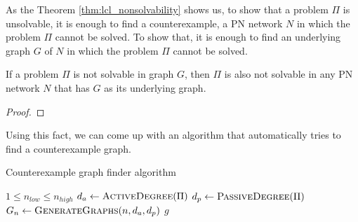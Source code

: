 As the Theorem \ref{thm:lcl_nonsolvability} shows us, to show that a problem $\Pi$ is unsolvable, it is enough to find a counterexample, a PN network $N$ in which the problem $\Pi$ cannot be solved.
To show that, it is enough to find an underlying graph $G$ of $N$ in which the problem $\Pi$ cannot be solved.
\begin{theorem} \label{thm:problem_nonsolvability_in_graphs}
    If a problem $\Pi$ is not solvable in graph $G$, then $\Pi$ is also not solvable in any PN network $N$ that has $G$ as its underlying graph.
\end{theorem}
\begin{proof}
\end{proof}

Using this fact, we can come up with an algorithm that automatically tries to find a counterexample graph.

\begin{algorithm}[H]
    \caption{Counterexample graph finder algorithm}
    \label{alg:counterexample_finder}
    \begin{algorithmic}[1] %
        \Require $1 \leq n_{low} \leq n_{high}$
          \label{alg:counterexample_finder:n_loop}
            \State $d_a \gets \textsc{ActiveDegree}(\Pi)$ \label{alg:counterexample_finder:d_a}
            \State $d_p \gets \textsc{PassiveDegree}(\Pi)$ \label{alg:counterexample_finder:d_p}
              \label{alg:counterexample_finder:n}
                \State $G_n \gets \textsc{GenerateGraphs}(n, d_a, d_p)$ \label{alg:counterexample_finder:Gn}
                 \label{alg:counterexample_finder:g}
                     \label{alg:counterexample_finder:is_unsolvable}
                        \State \Return $g$ \label{alg:counterexample_finder:return_g}
                    \EndIf
                \EndFor
            \EndFor
            \State \Return {} \label{alg:counterexample_finder:return_nothing}
        \EndFunction
    \end{algorithmic}
\end{algorithm}

